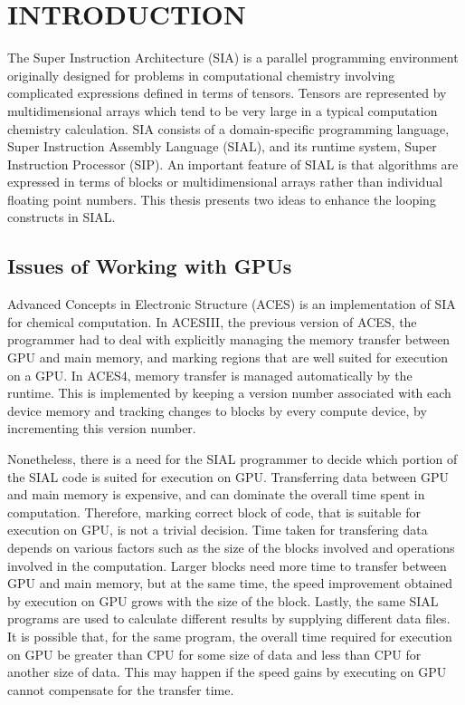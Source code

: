 \chapter{INTRODUCTION}\label{intro}
The Super Instruction Architecture (SIA)\cite{Sanders:2010:BLR:1884643.1884677} is a parallel programming environment
originally designed for problems in computational chemistry involving complicated
expressions defined in terms of tensors. Tensors are represented by
multidimensional arrays which tend to be very large in a typical computation chemistry
calculation. SIA consists of a
domain-specific programming language, Super Instruction Assembly Language
(SIAL), and its runtime system, Super Instruction Processor (SIP). An important
feature of SIAL is that algorithms are expressed in terms of blocks or
multidimensional arrays rather than individual floating point numbers. This thesis
presents two ideas to enhance the looping constructs in SIAL.

\section{Issues of Working with GPUs}
Advanced Concepts in Electronic Structure (ACES)\cite{doi:10.1002/qua.560440876}\cite{doi:10.1002/wcms.77} is an implementation of SIA for
chemical computation.
In ACESIII\cite{Jindal2016}, the previous version of ACES, the programmer had to deal with explicitly managing
the memory transfer between GPU and main memory, and marking regions that are well suited for execution
on a GPU. In ACES4, memory transfer is managed automatically by the runtime.
This is implemented by keeping a version number associated with each device memory
and tracking changes to blocks by every compute device, by incrementing this version
number.

Nonetheless, there is a need for the SIAL programmer to decide which portion of the SIAL code
is suited for execution on GPU. Transferring data between GPU and main memory is
expensive\cite{datatransferoptimization}, and can dominate the overall time spent in computation. Therefore, marking
correct block of code, that is suitable for execution on GPU, is not
a trivial decision. Time taken for transfering data depends on various factors such as
the size of the blocks involved and operations involved in the computation.
Larger blocks need more time to transfer between GPU and main memory, but at the
same time, the speed improvement obtained by execution on GPU grows
with the size of the block. Lastly, the same SIAL programs are used to
calculate different results by supplying different data files. It is possible that,
for the same program, the overall time required for execution on GPU be greater
than CPU for some size of data and less than CPU for another size of data.
This may happen if the speed gains by executing on GPU cannot compensate for the
transfer time.

